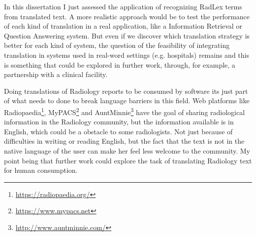 In this dissertation I just assessed the application of recognizing RadLex terms from translated text. A more realistic approach would be to test the performance of each kind of translation in a real application, like a Information Retrieval \citep{Manning2009b} or Question Answering system. But even if we discover which translation strategy is better for each kind of system, the question of the feasibility of integrating translation in systems used in real-word settings (e.g. hospitals) remains and this is something that could be explored in further work, through, for example, a partnership with a clinical facility.

Doing translations of Radiology reports to be consumed by software its just part of what needs to done to break language barriers in this field. Web platforms like Radiopaedia\footnote{\url{https://radiopaedia.org/}}, MyPACS\footnote{\url{https://www.mypacs.net}} and AuntMinnie\footnote{\url{http://www.auntminnie.com/}} have the goal of sharing radiological information in the Radiology community, but the information available is in English, which could be a obstacle to some radiologists. Not just because of difficulties in writing or reading English, but the fact that the text is not in the native language of the user can make her feel less welcome to the community. My point being that further work could explore the task of translating Radiology text for human consumption.